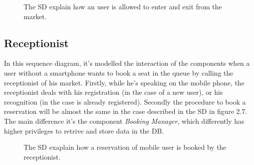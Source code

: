 \begin{figure}[H]
  \label{EntryExitSD}
  \centering
    \caption{The SD explain how an user is allowed to enter and exit from the market.}
\end{figure} 

\pagebreak

\subsection{Receptionist}
In this sequence diagram, it's modelled the interaction of the components when a user without a smartphone wants to book a seat in the queue by calling the receptionist of his market. Firstly, while he's speaking on the mobile phone, the receptionist deals with his registration (in the case of a new user), or his recognition (in the case is already registered).
Secondly the procedure to book a reservation will be almost the same in the case described in the SD in figure 2.7. The main difference it's the component \textit{Booking Manager}, which differently has higher privileges to retrive and store data in the DB.

\begin{figure}[H]
  \label{MobileUserSD}
  \centering
    \caption{The SD exaplain how a reservation of mobile user is booked by the receptionist.}
\end{figure} 

